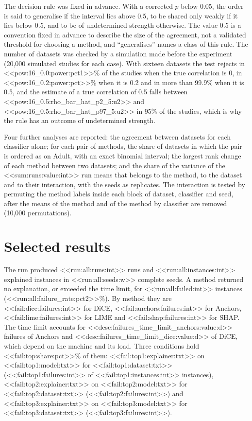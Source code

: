 \documentclass[10pt,a4paper,twocolumn]{article}
\begin{document}
The decision rule was fixed in advance. With a corrected $p$ below 0.05, the order is
said to generalise if the interval lies above 0.5, to be shared only weakly if it lies
below 0.5, and to be of undetermined strength otherwise. The value 0.5 is a convention
fixed in advance to describe the size of the agreement, not a validated threshold for
choosing a method, and ``generalises'' names a class of this rule. The number of datasets
was checked
by a simulation made before the experiment (20,000 simulated studies for each case). With
sixteen datasets the test rejects in <<pow:16_0.0:power:pct1>>\% of the studies when the
true correlation is 0, in <<pow:16_0.2:power:pct>>\% when it is 0.2 and in more than
99.9\% when it is 0.5, and the estimate of a true correlation of 0.5 falls between
<<pow:16_0.5:rho_bar_hat_p2_5:u2>> and <<pow:16_0.5:rho_bar_hat_p97_5:u2>> in 95\% of the
studies, which is why the rule has an outcome of undetermined strength.

Four further analyses are reported: the agreement between datasets for each
classifier alone; for each pair of methods, the share of datasets in
which the pair is ordered as on Adult, with an exact binomial interval; the largest rank
change of each method between two datasets; and the share of the variance of the
<<sum:runs:value:int>> run means that belongs to the method, to the dataset and to their
interaction, with the seeds as replicates. The interaction is tested by permuting the
method labels inside each block of dataset, classifier and seed, after the means of the
method and of the method by classifier are removed (10,000 permutations).

\section{Selected results}

The run produced <<run:all:runs:int>> runs and <<run:all:instances:int>> explained
instances in <<run:all:seeds:w>> complete seeds. A method returned no explanation, or
exceeded the time limit, for <<run:all:failed:int>> instances
(<<run:all:failure_rate:pct2>>\%). By method they are <<fail:dice:failures:int>> for DiCE,
<<fail:anchors:failures:int>> for Anchors, <<fail:lime:failures:int>> for LIME and
<<fail:shap:failures:int>> for SHAP. The time limit accounts for
<<desc:failures_time_limit_anchors:value:d>> failures of Anchors and
<<desc:failures_time_limit_dice:value:d>> of DiCE, which depend on the machine and its
load. Three conditions
hold <<fail:top:share:pct>>\% of them: <<fail:top1:explainer:txt>> on
<<fail:top1:model:txt>> for <<fail:top1:dataset:txt>> (<<fail:top1:failures:int>> of
<<fail:top1:instances:int>> instances), <<fail:top2:explainer:txt>> on
<<fail:top2:model:txt>> for <<fail:top2:dataset:txt>> (<<fail:top2:failures:int>>) and
<<fail:top3:explainer:txt>> on <<fail:top3:model:txt>> for <<fail:top3:dataset:txt>>
(<<fail:top3:failures:int>>).
\end{document}

